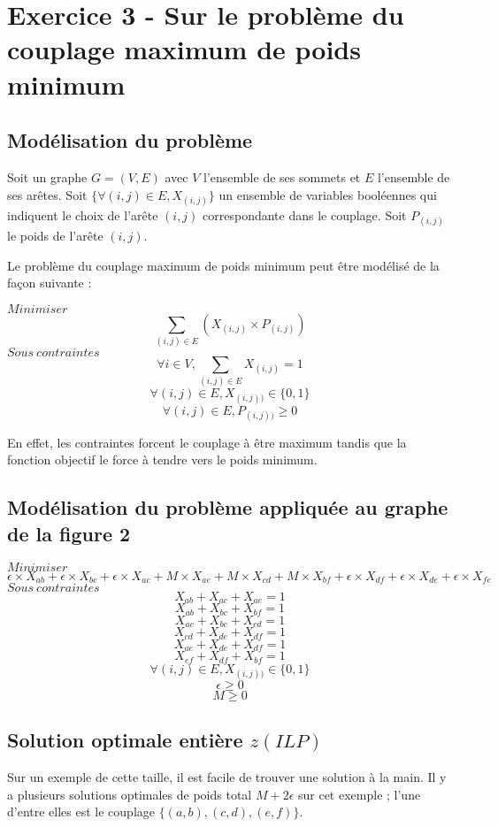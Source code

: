 
\section{Exercice 3 - Sur le problème du couplage maximum de poids minimum}

\subsection{Modélisation du problème}
Soit un graphe $G = (V,E)$ avec $V$ l'ensemble de ses sommets et $E$ l'ensemble de ses arêtes. Soit $\{ \forall{(i,j) \in E}, X_{(i,j)}\}$ un ensemble de variables booléennes qui indiquent le choix de l'arête $(i,j)$ correspondante dans le couplage. Soit $P_{(i,j)}$ le poids de l'arête $(i,j)$.

Le problème du couplage maximum de poids minimum peut être modélisé de la façon suivante :

$ Minimiser $ $$ \sum\limits_{(i,j) \in E} (X_{(i,j)} \times P_{(i,j)}) $$
$ Sous\ contraintes $
$$ \forall{i \in V}, \sum\limits_{(i,j) \in E} X_{(i,j)} = 1 $$
$$ \forall{(i,j) \in E}, X_{(i,j))} \in \{0,1\} $$
$$ \forall{(i,j) \in E}, P_{(i,j))} \geq 0 $$

En effet, les contraintes forcent le couplage à être maximum tandis que la fonction objectif le force à tendre vers le poids minimum.

\subsection{Modélisation du problème appliquée au graphe de la figure 2}
$ Minimiser $ $$ \epsilon \times X_{ab} + \epsilon \times X_{bc} + \epsilon \times X_{ac} + M \times X_{ae} + M \times X_{cd} + M \times X_{bf} + \epsilon \times X_{df} + \epsilon \times X_{de} + \epsilon \times X_{fe}$$
$ Sous\ contraintes $
$$ X_{ab} + X_{ac} + X_{ae} = 1 $$
$$ X_{ab} + X_{bc} + X_{bf} = 1 $$
$$ X_{ac} + X_{bc} + X_{cd} = 1 $$
$$ X_{cd} + X_{de} + X_{df} = 1 $$
$$ X_{ae} + X_{de} + X_{df} = 1 $$
$$ X_{ef} + X_{df} + X_{bf} = 1 $$
$$ \forall{(i,j) \in E}, X_{(i,j))} \in \{0,1\} $$
$$ \epsilon \geq 0 $$
$$ M \geq 0 $$

\subsection{Solution optimale entière $z(ILP)$}
Sur un exemple de cette taille, il est facile de trouver une solution à la main. Il y a plusieurs solutions optimales de poids total $M+2\epsilon$ sur cet exemple ; l'une d'entre elles est le couplage $\{(a,b), (c,d), (e,f)\}$.

